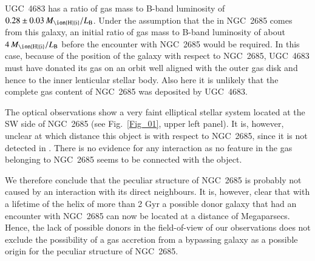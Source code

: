 \documentclass[oldversion]{aa}
\begin{document}
UGC~4683 has a ratio of gas mass to B-band luminosity of $0.28\pm 0.03
\,{M_{\rm {\ion{H}{i}}}}/{L_{\rm B}}$. Under the assumption that the
 in NGC~2685 comes from this galaxy, an initial ratio of gas
mass to B-band luminosity of about $4\,{M_{\rm {\ion{H}{i}}}}/{L_{\rm
B}}$ before the encounter with NGC~2685 would be required. In this
case, because of the position of the galaxy with respect to NGC~2685,
UGC~4683 must have donated its gas on an orbit well aligned with the
outer gas disk and hence to the inner lenticular stellar body. Also
here it is unlikely that the complete gas content of NGC~2685 was
deposited by UGC~4683.

The optical observations show a very faint elliptical stellar system
located at the SW side of NGC~2685 (see Fig.~\ref{Fig_01}, upper left
panel). It is, however, unclear at which distance this object is with
respect to NGC~2685, since it is not detected in . There is
no evidence for any interaction as no  feature in the gas
belonging to NGC~2685 seems to be connected with the object.

We therefore conclude that the peculiar structure of NGC~2685 is
probably not caused by an interaction with its direct neighbours. It
is, however, clear that with a lifetime of the helix of more than 2
Gyr a possible donor galaxy that had an encounter with NGC~2685 can
now be located at a distance of Megaparsecs. Hence, the lack of
possible donors in the field-of-view of our  observations
does not exclude the possibility of a gas accretion from a bypassing
galaxy as a possible origin for the peculiar structure of NGC~2685.
%
%
\end{document}

